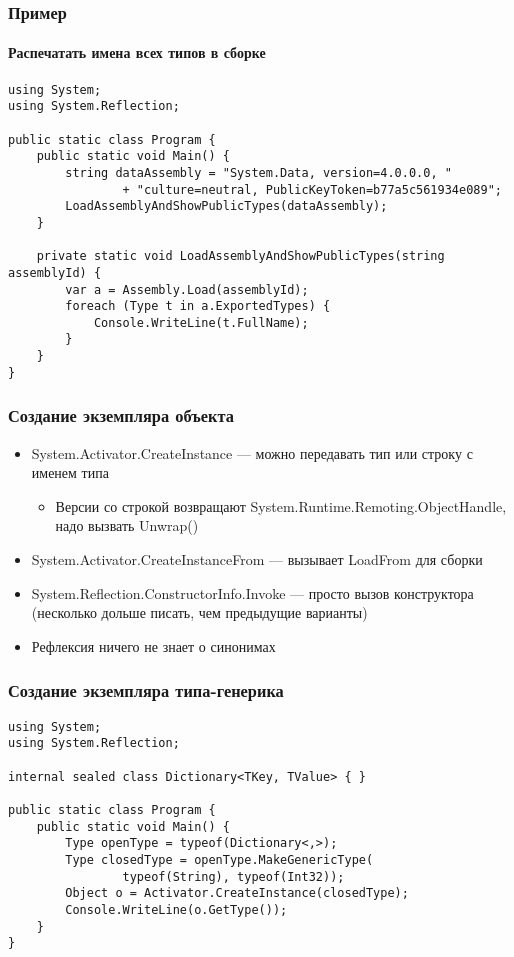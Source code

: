 \documentclass[xetex,mathserif,serif]{beamer}
\begin{document}
	\begin{frame}[fragile]
		\frametitle{Пример}
		\framesubtitle{Распечатать имена всех типов в сборке}
		\begin{footnotesize}
			\begin{verbatim}
using System;
using System.Reflection;

public static class Program {
    public static void Main() {
        string dataAssembly = "System.Data, version=4.0.0.0, "
                + "culture=neutral, PublicKeyToken=b77a5c561934e089";
        LoadAssemblyAndShowPublicTypes(dataAssembly);
    }

    private static void LoadAssemblyAndShowPublicTypes(string assemblyId) {
        var a = Assembly.Load(assemblyId);
        foreach (Type t in a.ExportedTypes) {
            Console.WriteLine(t.FullName);
        }
    }
}
			\end{verbatim}
		\end{footnotesize}
	\end{frame}

	\begin{frame}
		\frametitle{Создание экземпляра объекта}
		\begin{itemize}
			\item System.Activator.CreateInstance --- можно передавать тип или строку с именем типа
			\begin{itemize}
				\item Версии со строкой возвращают System.Runtime.Remoting.ObjectHandle, надо вызвать Unwrap()
			\end{itemize}
			\item System.Activator.CreateInstanceFrom --- вызывает LoadFrom для сборки
			\item System.Reflection.ConstructorInfo.Invoke --- просто вызов конструктора (несколько дольше писать, чем предыдущие варианты)
			\item Рефлексия ничего не знает о синонимах
		\end{itemize}
	\end{frame}

	\begin{frame}[fragile]
		\frametitle{Создание экземпляра типа-генерика}
		\begin{footnotesize}
			\begin{verbatim}
using System;
using System.Reflection;

internal sealed class Dictionary<TKey, TValue> { }

public static class Program {
    public static void Main() {
        Type openType = typeof(Dictionary<,>);
        Type closedType = openType.MakeGenericType(
                typeof(String), typeof(Int32));
        Object o = Activator.CreateInstance(closedType);
        Console.WriteLine(o.GetType());
    }
}
			\end{verbatim}
		\end{footnotesize}
	\end{frame}
\end{document}
